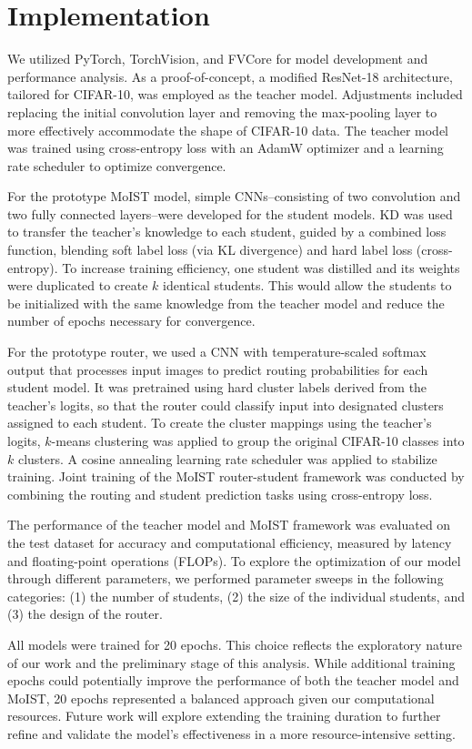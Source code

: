 \documentclass[conference]{IEEEtran}
\begin{document}
\section{Implementation}
We utilized PyTorch, TorchVision, and FVCore for model development and performance analysis. As a proof-of-concept, a modified ResNet-18 architecture, tailored for CIFAR-10, was employed as the teacher model. Adjustments included replacing the initial convolution layer and removing the max-pooling layer to more effectively accommodate the shape of CIFAR-10 data. The teacher model was trained using cross-entropy loss with an AdamW optimizer and a learning rate scheduler to optimize convergence.

For the prototype MoIST model, simple CNNs--consisting of two convolution and two fully connected layers--were developed for the student models. KD was used to transfer the teacher's knowledge to each student, guided by a combined loss function, blending soft label loss (via KL divergence) and hard label loss (cross-entropy). To increase training efficiency, one student was distilled and its weights were duplicated to create $k$ identical students. This would allow the students to be initialized with the same knowledge from the teacher model and reduce the number of epochs necessary for convergence.

For the prototype router, we used a CNN with temperature-scaled softmax output that processes input images to predict routing probabilities for each student model. It was pretrained using hard cluster labels derived from the teacher's logits, so that the router could classify input into designated clusters assigned to each student. To create the cluster mappings using the teacher's logits, $k$-means clustering was applied to group the original CIFAR-10 classes into $k$ clusters. A cosine annealing learning rate scheduler was applied to stabilize training. Joint training of the MoIST router-student framework was conducted by combining the routing and student prediction tasks using cross-entropy loss.

The performance of the teacher model and MoIST framework was evaluated on the test dataset for accuracy and computational efficiency, measured by latency and floating-point operations (FLOPs). To explore the optimization of our model through different parameters, we performed parameter sweeps in the following categories: (1) the number of students, (2) the size of the individual students, and (3) the design of the router.

All models were trained for 20 epochs. This choice reflects the exploratory nature of our work and the preliminary stage of this analysis. While additional training epochs could potentially improve the performance of both the teacher model and MoIST, 20 epochs represented a balanced approach given our computational resources. Future work will explore extending the training duration to further refine and validate the model's effectiveness in a more resource-intensive setting.
\end{document}
